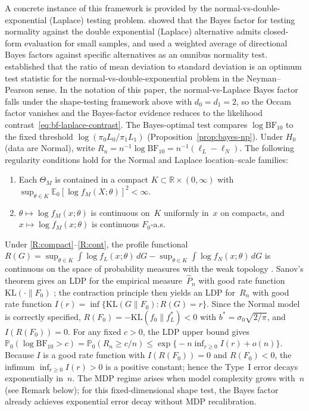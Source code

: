 \documentclass[11pt]{article}
\newcommand{\E}{\mathbb{E}}
\newcommand{\KL}{\mathrm{KL}}
\newcommand{\RR}{\mathbb{R}}
\newcommand{\1}{\mathbf{1}}
\newcommand{\PP}{\mathbb{P}}
\theoremstyle{plain}
\theoremstyle{definition}
\theoremstyle{remark}
\begin{document}
A concrete instance of this framework is provided by the normal-vs-double-exponential (Laplace) testing problem.
\citet{Spiegelhalter1980omnibus} showed that the Bayes factor for testing normality against the double exponential (Laplace) alternative admits closed-form evaluation for small samples, and used a weighted average of directional Bayes factors against specific alternatives as an omnibus normality test.
\citet{Uthoff1970} established that the ratio of mean deviation to standard deviation is an optimum test statistic for the normal-vs-double-exponential problem in the Neyman--Pearson sense.
In the notation of this paper, the normal-vs-Laplace Bayes factor falls under the shape-testing framework above with $d_0=d_1=2$, so the Occam factor vanishes and the Bayes-factor evidence reduces to the likelihood contrast~\eqref{eq:bf-laplace-contrast}.
The Bayes-optimal test compares $\log\mathrm{BF}_{10}$ to the fixed threshold $\log(\pi_0L_0/\pi_1L_1)$ (Proposition~\ref{prop:bayes-np}).
Under $H_0$ (data are Normal), write $R_n = n^{-1}\log\mathrm{BF}_{10}=n^{-1}(\ell_L-\ell_N)$.
The following regularity conditions hold for the Normal and Laplace location--scale families:
\begin{enumerate}[label=(R\arabic*),leftmargin=3em]
\item\label{R:compact} Each $\Theta_M$ is contained in a compact
$K\subset\RR\times(0,\infty)$ with
$\sup_{\theta\in K}\E_0[\log f_M(X;\theta)]^2<\infty$.
\item\label{R:cont} $\theta\mapsto\log f_M(x;\theta)$ is continuous on~$K$
uniformly in~$x$ on compacts, and
$x\mapsto\log f_M(x;\theta)$ is continuous $F_0$-a.s.
\end{enumerate}
Under \ref{R:compact}--\ref{R:cont}, the profile functional $R(G)=\sup_{\theta\in K}\int\log f_L(x;\theta)\,dG-\sup_{\theta\in K}\int\log f_N(x;\theta)\,dG$ is continuous on the space of probability measures with the weak topology \citep[Lem.~2.3]{KieferWolfowitz1956}.
Sanov's theorem gives an LDP for the empirical measure~$\hat P_n$ with good rate function $\KL(\cdot\|F_0)$ \citep[Thm.~6.2.10]{DemboZeitouni1998}; the contraction principle \citep[Thm.~4.2.1]{DemboZeitouni1998} then yields an LDP for~$R_n$ with good rate function $I(r)=\inf\{\KL(G\|F_0): R(G)=r\}$.
Since the Normal model is correctly specified, $R(F_0)=-\KL(f_0\|f_L^*)<0$ with $b^*=\sigma_0\sqrt{2/\pi}$, and $I(R(F_0))=0$.
For any fixed $c>0$, the LDP upper bound gives
$\PP_0(\log\mathrm{BF}_{10}>c)=\PP_0(R_n\ge c/n)\le\exp\bigl\{-n\inf_{r\ge 0}I(r)+o(n)\bigr\}$.
Because $I$ is a good rate function with $I(R(F_0))=0$ and $R(F_0)<0$, the infimum $\inf_{r\ge 0}I(r)>0$ is a positive constant; hence the Type~I error decays exponentially in~$n$.
The MDP regime arises when model complexity grows with~$n$ (see Remark below); for this fixed-dimensional shape test, the Bayes factor already achieves exponential error decay without MDP recalibration.
\end{document}
